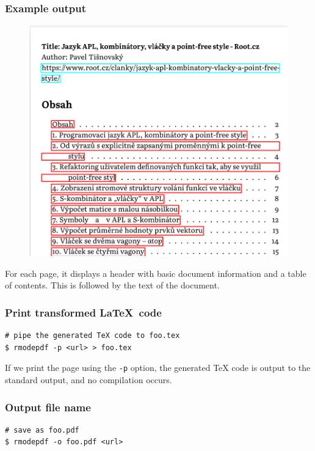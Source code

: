 \begin{frame}[fragile]
  \frametitle{Example output}
  \begin{figure}
    \begin{center}
      \includegraphics[height=0.7\textheight]{img/rmodepdf-article.png}
    \end{center}
  \end{figure}
  
\end{frame}

For each page, it displays a header with basic document information and a table
of contents. This is followed by the text of the document.



\begin{frame}[fragile]
  \frametitle{Print transformed \LaTeX\ code}
\begin{verbatim}
# pipe the generated TeX code to foo.tex
$ rmodepdf -p <url> > foo.tex
\end{verbatim}
\end{frame}

If we print the page using the \verb|-p| option, the generated TeX code is output to the standard output, and no compilation occurs.



\begin{frame}[fragile]
  \frametitle{Output file name}
  \begin{verbatim}
# save as foo.pdf
$ rmodepdf -o foo.pdf <url>
  \end{verbatim}

\end{frame}


